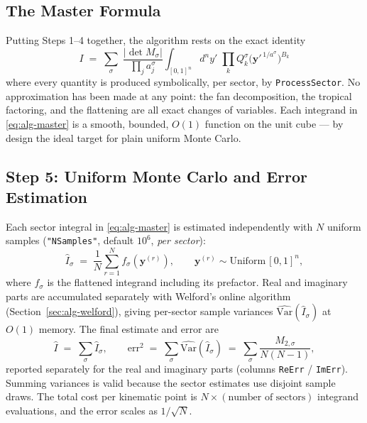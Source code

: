 \documentclass[11pt,a4paper]{article}
\begin{document}
\subsection{The Master Formula}

Putting Steps 1--4 together, the algorithm rests on the exact identity
\begin{equation}\label{eq:alg-master}
\boxed{\;
I \;=\; \sum_{\sigma}\;
\frac{|\det M_\sigma|}{\prod_j a^\sigma_j}
\int_{[0,1]^n} d^n y' \;
\prod_k Q^\sigma_k\!\bigl(\mathbf{y}'^{\,1/a^\sigma}\bigr)^{B_k}
\;}
\end{equation}
where every quantity is produced symbolically, per sector, by
\texttt{ProcessSector}. No approximation has been made at any point: the fan
decomposition, the tropical factoring, and the flattening are all exact
changes of variables. Each integrand in \eqref{eq:alg-master} is a smooth,
bounded, $O(1)$ function on the unit cube --- by design the ideal target for
plain uniform Monte Carlo.

\subsection{Step 5: Uniform Monte Carlo and Error Estimation}\label{sec:alg-mc}

Each sector integral in \eqref{eq:alg-master} is estimated independently with
$N$ uniform samples (\texttt{"NSamples"}, default $10^6$, \emph{per sector}):
\begin{equation}
\widehat{I}_\sigma \;=\; \frac{1}{N} \sum_{r=1}^{N}
f_\sigma(\mathbf{y}^{(r)}), \qquad \mathbf{y}^{(r)} \sim
\mathrm{Uniform}\,[0,1]^n,
\end{equation}
where $f_\sigma$ is the flattened integrand including its prefactor. Real and
imaginary parts are accumulated separately with Welford's online algorithm
(Section~\ref{sec:alg-welford}), giving per-sector sample variances
$\widehat{\mathrm{Var}}(\widehat{I}_\sigma)$ at $O(1)$ memory. The final
estimate and error are
\begin{equation}
\widehat{I} \;=\; \sum_\sigma \widehat{I}_\sigma,
\qquad
\mathrm{err}^2 \;=\; \sum_\sigma \widehat{\mathrm{Var}}(\widehat{I}_\sigma)
\;=\; \sum_\sigma \frac{M_{2,\sigma}}{N(N-1)},
\end{equation}
reported separately for the real and imaginary parts (columns
\texttt{ReErr} / \texttt{ImErr}). Summing variances is valid because the
sector estimates use disjoint sample draws. The total cost per kinematic
point is $N \times (\text{number of sectors})$ integrand evaluations, and the
error scales as $1/\sqrt{N}$.
\end{document}
